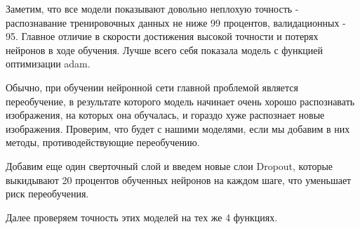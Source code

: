 Заметим, что все модели показывают довольно неплохую точность - распознавание тренировочных данных не ниже 99 процентов, валидационных - 95. Главное отличие в скорости достижения высокой точности и потерях нейронов в ходе обучения. Лучше всего себя показала модель с функцией оптимизации adam.

Обычно, при обучении нейронной сети главной проблемой является переобучение, в результате которого модель начинает очень хорошо распознавать изображения, на которых она обучалась, и гораздо хуже распознает новые изображения. Проверим, что будет с нашими моделями, если мы добавим в них методы, противодействующие переобучению. 

Добавим еще один сверточный слой и введем новые слои Dropout, которые выкидывают 20 процентов обученных нейронов на каждом шаге, что уменьшает риск переобучения.  
\begin{figure}[H]
\end{figure}
Далее проверяем точность этих моделей на тех же 4 функциях.

\begin{figure}[H]
\end{figure}

